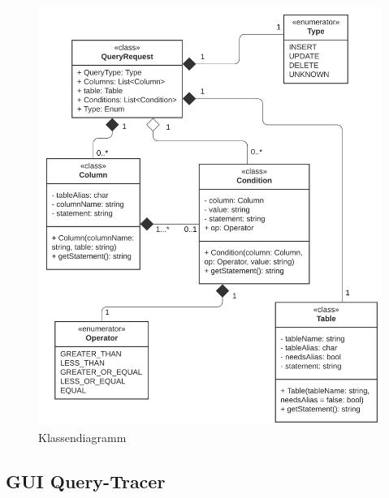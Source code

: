 \documentclass[11pt,toc=sectionentrywithoutdots, 
headheight=44pt, headings=optiontoheadandtoc, hyperfootnotes=false, hypertexnames=false]{scrartcl}
\begin{document}
 \begin{figure}[H]
 \centering

	\includegraphics[scale=1.2]{UML-Klasse.png}
	 \caption{Klassendiagramm}
 \end{figure}
 \clearpage
 
\subsection{GUI Query-Tracer}
 \label{fig:GUI Query-Tracer}
\end{document}

